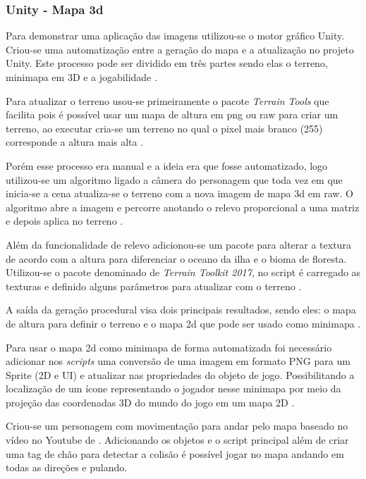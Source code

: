 \subsubsection{Unity - Mapa 3d}

Para demonstrar uma aplicação das imagens utilizou-se o motor gráfico Unity. Criou-se uma automatização entre a geração do mapa e a atualização no projeto Unity. Este processo pode ser dividido em três partes sendo elas o terreno, minimapa em 3D e a jogabilidade \cite{unitywebpage}.

Para atualizar o terreno usou-se primeiramente o pacote \textit{Terrain Tools} que facilita pois é possível usar um mapa de altura em png ou raw para criar um terreno, ao executar cria-se um terreno no qual o pixel mais branco (255) corresponde a altura mais alta \cite{unity-terrain-tools}.

Porém esse processo era manual e a ideia era que fosse automatizado, logo utilizou-se um algoritmo ligado a câmera do personagem que toda vez em que inicia-se a cena atualiza-se o terreno com a nova imagem de mapa 3d em raw. O algoritmo abre a imagem e percorre anotando o relevo proporcional a uma matriz e depois aplica no terreno \cite{unity-terrain-tools}.

Além da funcionalidade de relevo adicionou-se um pacote para alterar a textura de acordo com a altura para diferenciar o oceano da ilha e o bioma de floresta. Utilizou-se o pacote denominado de \textit{Terrain Toolkit 2017}, no script é carregado as texturas e definido alguns parâmetros para atualizar com o terreno \cite{unity-terrain-toolkit}.

A saída da geração procedural visa dois principais resultados, sendo eles: o mapa de altura para definir o terreno e o mapa 2d que pode ser usado como minimapa \cite{unitywebpage}.

Para usar o mapa 2d como minimapa de forma automatizada foi necessário adicionar nos \textit{scripts} uma conversão de uma imagem em formato PNG para um Sprite (2D e UI) e atualizar nas propriedades do objeto de jogo. Possibilitando a localização de um ícone representando o jogador nesse minimapa por meio da projeção das coordenadas 3D do mundo do jogo em um mapa 2D \cite{unitywebpage}.


Criou-se um personagem com movimentação para andar pelo mapa baseado no vídeo no Youtube de . Adicionando os objetos e o script principal além de criar uma tag de chão para detectar a colisão é possível jogar no mapa andando em todas as direções e pulando.

